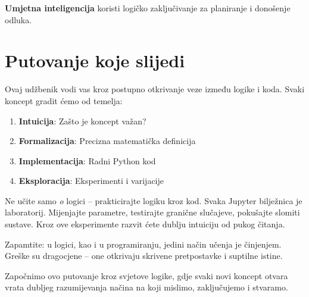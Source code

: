 \textbf{Umjetna inteligencija} koristi logičko zaključivanje za planiranje i donošenje odluka.




\section{Putovanje koje slijedi}


Ovaj udžbenik vodi vas kroz postupno otkrivanje veze između logike i koda. Svaki koncept gradit ćemo od temelja:


\begin{enumerate}
\item \textbf{Intuicija}: Zašto je koncept važan?
\item \textbf{Formalizacija}: Precizna matematička definicija
\item \textbf{Implementacija}: Radni Python kod
\item \textbf{Eksploracija}: Eksperimenti i varijacije
\end{enumerate}


Ne učite samo \emph{o} logici -- prakticirajte logiku kroz kod. Svaka Jupyter bilježnica je laboratorij. Mijenjajte parametre, testirajte granične slučajeve, pokušajte slomiti sustave. Kroz ove eksperimente razvit ćete dublju intuiciju od pukog čitanja.


Zapamtite: u logici, kao i u programiranju, jedini način učenja je činjenjem. Greške su dragocjene -- one otkrivaju skrivene pretpostavke i suptilne istine.


Započnimo ovo putovanje kroz svjetove logike, gdje svaki novi koncept otvara vrata dubljeg razumijevanja načina na koji mislimo, zaključujemo i stvaramo.

